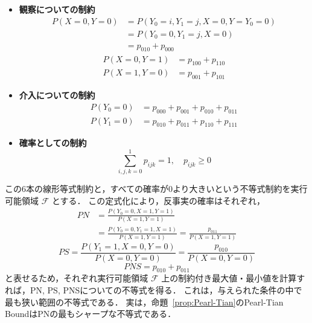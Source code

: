 \documentclass[uplatex, dvipdfmx]{jsarticle}
\begin{document}
\begin{itemize}
  \item{\textbf{観察についての制約}}
  \begin{align}
    P(X=0, Y=0) &= P(Y_0=i, Y_1=j, X=0, Y=Y_0=0) \\
    &= P(Y_0=0, Y_1=j, X=0) \\
    &= p_{010} + p_{000}
  \end{align}
  \begin{align}
    P(X=0, Y=1) &= p_{100} + p_{110} \\
    P(X=1, Y=0) &= p_{001} + p_{101}
  \end{align}

  \item{\textbf{介入についての制約}}
  \begin{align}
    P(Y_0=0) &= p_{000} + p_{001} + p_{010} + p_{011} \\
    P(Y_1=0) &= p_{010} + p_{011} + p_{110} + p_{111}
  \end{align}

  \item{\textbf{確率としての制約}}
  \begin{equation}
    \sum_{i,j,k=0}^1 p_{ijk} = 1, \quad p_{ijk} \geq 0
  \end{equation}
\end{itemize}

この6本の線形等式制約と，すべての確率が0より大きいという不等式制約を実行可能領域 $\mathcal{F}$ とする．
この定式化により，反事実の確率はそれぞれ，
\begin{align}
  PN &= \frac{P(Y_0=0, X=1, Y=1)}{P(X=1, Y=1)} \\
  &= \frac{P(Y_0=0, Y_1=1, X=1)}{P(X=1, Y=1)} = \frac{p_{011}}{P(X=1, Y=1)}
\end{align}
\begin{equation}
  PS = \frac{P(Y_1=1, X=0, Y=0)}{P(X=0, Y=0)} = \frac{p_{010}}{P(X=0, Y=0)}
\end{equation}
\begin{equation}
  PNS = p_{010} + p_{011}
\end{equation}
と表せるため，それぞれ実行可能領域 $\mathcal{F}$ 上の制約付き最大値・最小値を計算すれば，PN, PS, PNSについての不等式を得る．
これは，与えられた条件の中で最も狭い範囲の不等式である．
実は，命題~\ref{prop:Pearl-Tian}のPearl-Tian BoundはPNの最もシャープな不等式である．
\end{document}
